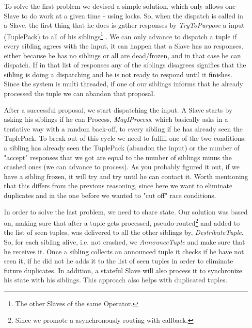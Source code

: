 \documentclass[times, 10pt,twocolumn]{article}
\begin{document}
To solve the first problem we devised a simple solution, which only allows one Slave to do work at a given time - using locks. So, when the dispatch is called in a Slave, the first thing that he does is gather responses by \textit{TryToPurpose} a input (TuplePack) to all of his siblings\footnote
{%
	The other Slaves of the same Operator.
}   
. We can only advance to dispatch a tuple if every sibling agrees with the input, it can happen that a Slave has no responses, either because he has no siblings or all are dead/frozen, and in that case he can dispatch. If in that list of responses any of the siblings disagrees signifies that the sibling is doing a dispatching and he is not ready to respond until it finishes. Since the system is multi threaded, if one of our siblings informs that he already processed the tuple we can abandon that proposal.

After a successful proposal, we start dispatching the input. A Slave starts by asking his siblings if he can Process, \textit{MayIProcess}, which basically asks in a tentative way with a random back-off, to every sibling if he has already seen the TuplePack. To break out of this cycle we need to fulfill one of the two conditions: a sibling has already seen the TuplePack (abandon the input) or the number of "accept" responses that we got are equal to the number of siblings minus the crashed ones (we can advance to process). As you probably figured it out, if we have a sibling frozen, it will try and try until he can contact it. Worth mentioning that this differs from the previous reasoning, since here we want to eliminate duplicates and in the one before we wanted to "cut off" race conditions. 

In order to solve the last problem, we need to share state. Our solution was based on, making sure that after a tuple gets processed, pseudo-routed\footnote
{%
	Since we promote a asynchronously routing with callback.
}   
and added to the list of seen tuples, was delivered to all the other siblings by, \textit{DestributeTuple}. So, for each sibling alive, i.e. not crashed, we \textit{AnnounceTuple} and make sure that he receives it. Once a sibling collects an announced tuple it checks if he have not seen it, if he did not he adds it to the list of seen tuples in order to eliminate future duplicates. In addition, a stateful Slave will also process it to synchronize his state with his siblings. This approach also helps with duplicated tuples.

\end{document}
